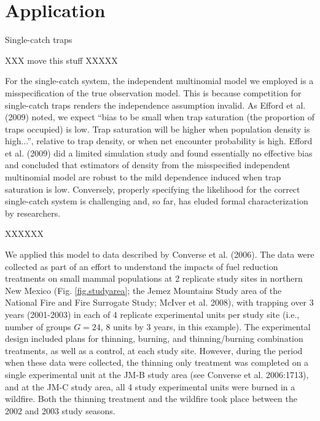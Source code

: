 \section{Application}

Single-catch traps

XXX move this stuff XXXXX

 For the single-catch
system, the independent multinomial model we employed is a
misspecification of the true observation model.  This is because
competition for single-catch traps renders the independence assumption
invalid. As Efford et al. (2009) noted, we expect ``bias to be small
when trap saturation (the proportion of traps occupied) is low.  Trap
saturation will be higher when population density is high...'',
relative to trap density, or when net encounter probability is high.
Efford et al. (2009) did a limited simulation study and found essentially no
effective bias and concluded that estimators of density from the
misspecified independent multinomial model are robust to the mild
dependence induced when trap saturation is low. Conversely, properly
specifying the likelihood for the correct single-catch system is
challenging and, so far, has eluded formal characterization by
researchers.

XXXXXX






We applied this model to data described by Converse et al. (2006). The
data were collected as part of an effort to understand the impacts of
fuel reduction treatments on small mammal populations at 2 replicate
study sites in northern New Mexico (Fig. \ref{fig.studyarea}; 
the Jemez Mountains Study area of
the National Fire and Fire Surrogate Study; McIver et al. 2008), with
trapping over 3 years (2001-2003) in each of 4 replicate experimental
units per study site (i.e., number of groups $G = 24$, 8 units by 3
years, in this example).  The experimental design included plans for
thinning, burning, and thinning/burning combination treatments, as
well as a control, at each study site. However, during the period when
these data were collected, the thinning only treatment was completed
on a single experimental unit at the JM-B study area (see Converse et
al. 2006:1713), and at the JM-C study area, all 4 study experimental
units were burned in a wildfire. Both the thinning treatment and the
wildfire took place between the 2002 and 2003 study seasons.

